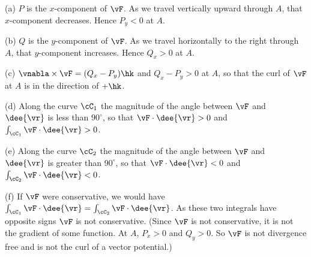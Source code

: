 \begin{solution} 
(a) $P$ is the $x$-component of $\vF$. As we travel vertically upward 
through $A$, that $x$-component decreases. Hence $P_y<0$ at $A$.
 
(b) $Q$ is the $y$-component of $\vF$. As we travel horizontally to the
right through $A$, that $y$-component increases. Hence $Q_x>0$ at $A$.

(c) $\vnabla\times\vF = (Q_x-P_y)\hk$ and $Q_x-P_y>0$ at $A$, so that 
the curl of $\vF$ at $A$ is in the direction of $+\hk$. 

(d) Along the curve $\cC_1$ the magnitude of the angle between $\vF$ 
and $\dee{\vr}$ is less than $90^\circ$, so that $\vF\cdot\dee{\vr}>0$
and $\int_{\cC_1}\vF\cdot\dee{\vr}>0$.

(e) Along the curve $\cC_2$ the magnitude of the angle between $\vF$ 
and $\dee{\vr}$ is greater than $90^\circ$, so that $\vF\cdot\dee{\vr}<0$
and $\int_{\cC_2}\vF\cdot\dee{\vr}<0$.

(f) If $\vF$ were conservative, we would have $\int_{\cC_1}\vF\cdot\dee{\vr}
=\int_{\cC_2}\vF\cdot\dee{\vr}$. As these two integrals have opposite signs
$\vF$ is not conservative. (Since $\vF$ is not conservative, it is not the gradient of some function. At $A$, $P_x>0$ and $Q_y>0$. So $\vF$ is not divergence free and is not the curl of a vector potential.)


\end{solution}

